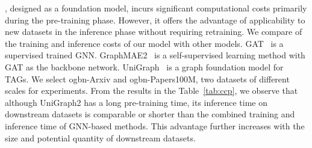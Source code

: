 \model, designed as a foundation model, incurs significant computational costs primarily during the pre-training phase. 
However, it offers the advantage of applicability to new datasets in the inference phase without requiring retraining. 
We compare of the training and inference costs of our model with other models. GAT~\cite{velivckovic2018graph} is a supervised trained GNN. 
GraphMAE2~\cite{hou2023graphmae2} is a self-supervised learning method with GAT as the backbone network. 
UniGraph~\cite{he2024unigraphlearningunifiedcrossdomain} is a graph foundation model for TAGs.
We select ogbn-Arxiv and ogbn-Papers100M, two datasets of different scales for experiments. 
From the results in the Table~\ref{tab:ccp}, we observe that although UniGraph2 has a long pre-training time, its inference time on downstream datasets is comparable or shorter than the combined training and inference time of GNN-based methods. This advantage further increases with the size and potential quantity of downstream datasets.
